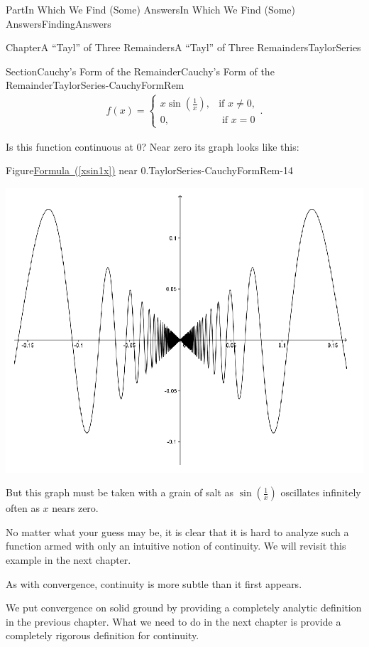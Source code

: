 \documentclass[oneside,10pt,]{book}
\newcommand{\xreffont}{\relax}
\numberwithin{equation}{part}
\newcommand{\amp}{&}
\begin{document}
\begin{partptx}{Part}{In Which We Find (Some) Answers}{}{In Which We Find (Some) Answers}{}{}{FindingAnswers}
\begin{chapterptx}{Chapter}{A ``Tayl'' of Three Remainders}{}{A ``Tayl'' of Three Remainders}{}{}{TaylorSeries}
\begin{sectionptx}{Section}{Cauchy's Form of the Remainder}{}{Cauchy's Form of the Remainder}{}{}{TaylorSeries-CauchyFormRem}
\begin{align}
f(x)= 
\begin{cases}
x\sin\left(\frac{1}{x}\right),\amp \text{if } x\neq 0,\\
0, \amp \text{ if } x=0 
\end{cases} \text{.}\label{xsin1x}
\end{align}
%
\par
Is this function continuous at 0?  Near zero its graph looks like this:%
\begin{figureptx}{Figure}{\hyperref[xsin1x]{Formula~({\xreffont\ref{xsin1x}})} near \(0\).}{TaylorSeries-CauchyFormRem-14}{}%
\begin{image}{0}{1}{0}{}%
\includegraphics[width=\linewidth]{external/images/Ch5fig4.png}
\end{image}%
\tcblower
\end{figureptx}%
But this graph must be taken with a grain of salt as \(\sin
\left(\frac{1}{x}\right)\) oscillates infinitely often as \(x\) nears zero.%
\par
No matter what your guess may be, it is clear that it is hard to analyze such a function armed with only an intuitive notion of continuity.  We will revisit this example in the next chapter.%
\par
As with convergence, continuity is more subtle than it first appears.%
\par
We put convergence on solid ground by providing a completely analytic definition in the previous chapter.  What we need to do in the next chapter is provide a completely rigorous definition for continuity.%

\end{sectionptx}
\end{chapterptx}
\end{partptx}
\end{document}

